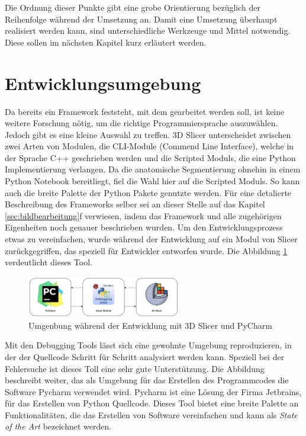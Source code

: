 Die Ordnung dieser Punkte gibt eine grobe Orientierung bezüglich der Reihenfolge
während der Umsetzung an. Damit eine Umsetzung überhaupt realisiert werden kann,
sind unterschiedliche Werkzeuge und Mittel notwendig. Diese sollen im nächsten Kapitel
kurz erläutert werden.

\section{Entwicklungsumgebung}
Da bereits ein Framework feststeht, mit dem gearbeitet werden soll, ist keine weitere
Forschung nötig, um die richtige Programmiersprache auszuwählen. Jedoch gibt es eine
kleine Auswahl zu treffen. 3D Slicer unterscheidet zwischen zwei Arten von
Modulen, die CLI-Module (Commend Line Interface), welche in der Sprache C++
geschrieben werden und die Scripted Moduls, die eine Python Implementierung verlangen.
Da die anatomische Segmentierung ohnehin in einem Python Notebook bereitliegt, fiel
die Wahl hier auf die Scripted Moduls. So kann auch die breite Palette der
Python Pakete genutzte werden. Für eine detalierte Beschreibung des Frameworks selber
sei an dieser Stelle auf das Kapitel \ref{sec:bildbearbeitung}f verwiesen, indem
das Framework und alle zugehörigen Eigenheiten noch genauer beschrieben wurden.
Um den Entwicklungsprozess etwas zu vereinfachen, wurde während der Entwicklung auf
ein Modul von Slicer zurückgegriffen, das speziell für Entwickler entworfen
wurde. Die Abbildung \ref{fig:entwicklungsumgebung} verdeutlicht dieses Tool.

\begin{figure}[h]
	\centering
	\includegraphics[width=0.6\textwidth]{img/Entwicklungsumgebung.png}
	\caption{Umgenbung während der Entwicklung mit 3D Slicer und PyCharm}
	\label{fig:entwicklungsumgebung}
\end{figure}

Mit den Debugging Tools lässt sich eine gewohnte Umgebung reproduzieren, in der der
Quellcode Schritt für Schritt analysiert werden kann. Speziell bei der
Fehlersuche ist dieses Toll eine sehr gute Unterstützung. Die Abbildung beschreibt
weiter, das als Umgebung für das Erstellen des Programmcodes die Software
Pycharm verwendet wird. Pycharm ist eine Lösung der Firma Jetbrains, für das
Erstellen von Python Quellcode. Dieses Tool bietet eine breite Palette an Funktionalitäten,
die das Erstellen von Software vereinfachen und kann als \textit{State of the
Art} bezeichnet werden.

